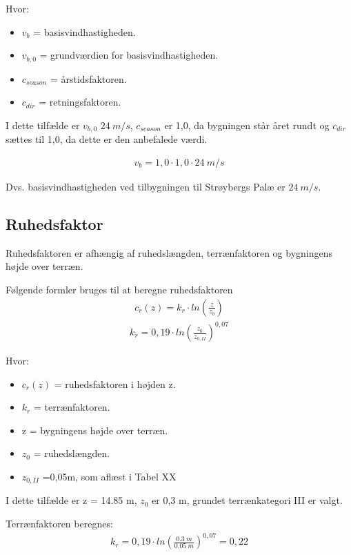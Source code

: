 Hvor:
\begin{itemize}
\item $v_{b}$ = basisvindhastigheden.
\item $v_{b,0}$ = grundværdien for basisvindhastigheden.
\item $ c_{season} $ = årstidsfaktoren.
\item $ c_{dir} $ = retningsfaktoren.
\end{itemize}
I dette tilfælde er $ v_{b,0} $ $ \SI{24}{m/s} $, $ c_{season} $ er 1,0, da bygningen står året rundt og $ c_{dir} $ sættes til 1,0, da dette er den anbefalede værdi.

\begin{align*}
v_{b} = 1,0 \cdot 1,0 \cdot \SI{24}{m/s}
\end{align*}

Dvs. basisvindhastigheden ved tilbygningen til Strøybergs Palæ er $ \SI{24}{m/s} $.








\subsection{Ruhedsfaktor}
Ruhedsfaktoren er afhængig af ruhedslængden, terrænfaktoren og bygningens højde over terræn.

Følgende formler bruges til at beregne ruhedsfaktoren
\begin{align*}
c_{r}(z) = k_{r} \cdot ln\left(\frac{z}{z_{0}}\right)
\end{align*}
\begin{align*}
k_{r} = 0,19 \cdot ln\left(\frac{z_{0}}{z_{0,II}}\right)^{0,07}
\end{align*}

Hvor:
\begin{itemize}
\item $ c_{r}(z) $ = ruhedsfaktoren i højden z.
\item $ k_{r} $ = terrænfaktoren.
\item z = bygningens højde over terræn.
\item $ z_{0} $ = ruhedslængden.
\item $ z_{0,II} $ =0,05m, som aflæst i Tabel XX
\end{itemize}

I dette tilfælde er z = 14.85 m, $ z_{0} $ er 0,3 m, grundet terrænkategori III er valgt.


Terrænfaktoren beregnes:
\begin{align*}
k_{r} = 0,19 \cdot ln\left(\frac{\SI{0,3}{m}}{\SI{0,05}{m}}\right)^{0,07} = 0,22
\end{align*}

